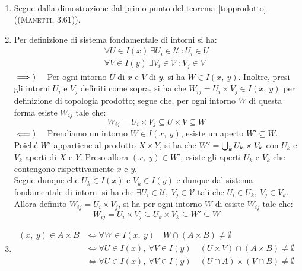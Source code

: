 \begin{demonstration}~{}
\begin{enumerate}[label=\Roman*]
\item Segue dalla dimostrazione dal primo punto del teorema \ref{topprodotto} (\textsc{(Manetti, 3.61)}).
\item Per definizione di sistema fondamentale di intorni si ha:
\begin{gather*}
\forall U\in I\left(x\right)\ \exists U_i\in\mathcal{U}\ \colon U_i\in U\\
\forall V\in I\left(y\right)\ \exists V_i\in\mathcal{V}\ \colon V_j\in V
\end{gather*}
$\implies)\quad$ Per ogni intorno $U$ di $x$ e $V$ di $y$, si ha $W\in I\left(x,\ y\right)$. Inoltre, presi gli intorni $U_i$ e $V_j$ definiti come sopra, si ha che $W_{ij} = U_i \times V_j\in I\left(x,\ y\right)$ per definizione di topologia prodotto; segue che, per ogni intorno $W$ di questa forma esiste $W_{ij}$ tale che:
\begin{equation*}
W_{ij} = U_i \times V_j\subseteq U\times V\subseteq W
\end{equation*}
$\impliedby)\quad$ Prendiamo un intorno $W\in I\left(x,\ y\right)$, esiste un aperto $W'\subseteq W$. Poiché $W'$ appartiene al prodotto $X\times Y$, si ha che $W'=\mathop{{\bigcup}}\displaylimits_k U_k\times V_k$ con $U_k$ e $V_k$ aperti di $X$ e $Y$. Preso allora $\left(x,\ y\right)\in W'$, esiste gli aperti $U_k$ e $V_k$ che contengono rispettivamente $x$ e $y$.\\
Segue dunque che $U_k\in I\left(x\right)$ e $V_k\in I\left(y\right)$ e dunque dal sistema fondamentale di intorni si ha che $\exists U_i\in\mathcal{U},\ V_j\in\mathcal{V}$ tali che $U_i\in U_k,\  V_j\in V_k$. Allora definito $W_{ij} = U_i \times V_j$, si ha per ogni intorno $W$ di esiste $W_{ij}$ tale che:
\begin{equation*}
	W_{ij} = U_i \times V_j\subseteq U_k\times V_k\subseteq W'\subseteq W
\end{equation*}
\item \begin{align*}
\left(x,\ y\right)\in \overline{A\times B}&\iff \forall W\in I\left(x,\ y\right)\quad W\cap\left(A\times B\right)\neq \emptyset\\
&\iff \forall U\in I\left(x\right),\ \forall V\in I\left(y\right)\quad \left(U\times V\right)\cap\left(A\times B\right)\neq \emptyset\\
&\iff \forall U\in I\left(x\right),\ \forall V\in I\left(y\right)\quad \left(U\cap A\right)\times\left(V\cap B\right)\neq \emptyset\\

\end{align*}
\end{enumerate}
\end{demonstration}
